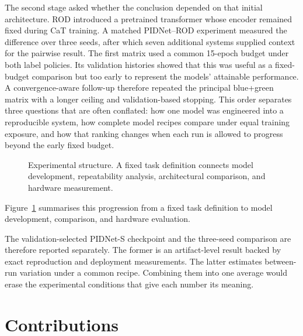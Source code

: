 The second stage asked whether the conclusion depended on that initial
architecture. ROD introduced a pretrained transformer whose encoder remained
fixed during CaT training. A matched PIDNet--ROD experiment measured the
difference over three seeds, after which seven additional systems supplied
context for the pairwise result. The first matrix used a common 15-epoch
budget under both label policies. Its validation histories showed that this
was useful as a fixed-budget comparison but too early to represent the models'
attainable performance. A convergence-aware follow-up therefore repeated the
principal blue+green matrix with a longer ceiling and validation-based stopping.
This order separates three questions that are often conflated: how one model
was engineered into a reproducible system, how complete model recipes compare
under equal training exposure, and how that ranking changes when each run is
allowed to progress beyond the early fixed budget.

\begin{figure}[htbp]
\centering
\resizebox{\textwidth}{!}{}
\caption[Experimental structure.]{Experimental structure. A fixed task
definition connects model development, repeatability analysis, architectural
comparison, and hardware measurement.}
\label{fig:research_progression}
\end{figure}

Figure~\ref{fig:research_progression} summarises this progression from a fixed
task definition to model development, comparison, and hardware evaluation.

The validation-selected PIDNet-S checkpoint and the three-seed comparison are
therefore reported separately. The former is an artifact-level result backed
by exact reproduction and deployment measurements. The latter estimates
between-run variation under a common recipe. Combining them into one average
would erase the experimental conditions that give each number its meaning.

\section{Contributions}

